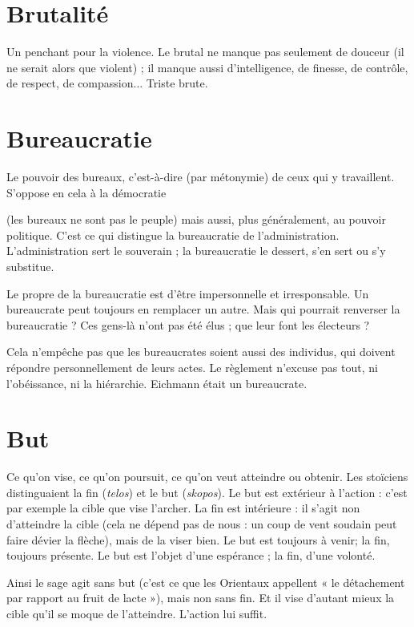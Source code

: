 \section{Brutalité}
Un penchant pour la violence. Le brutal ne manque pas seulement
de douceur (il ne serait alors que violent) ; il manque
aussi d'intelligence, de finesse, de contrôle, de respect, de compassion... Triste
brute.

\section{Bureaucratie}
Le pouvoir des bureaux, c’est-à-dire (par métonymie) de
ceux qui y travaillent. S’oppose en cela à la démocratie

(les bureaux ne sont pas le peuple) mais aussi, plus généralement, au pouvoir
politique. C’est ce qui distingue la bureaucratie de l'administration. L’administration
sert le souverain ; la bureaucratie le dessert, s’en sert ou s’y substitue.

Le propre de la bureaucratie est d’être impersonnelle et irresponsable. Un
bureaucrate peut toujours en remplacer un autre. Mais qui pourrait renverser la
bureaucratie ? Ces gens-là n’ont pas été élus ; que leur font les électeurs ?

Cela n'empêche pas que les bureaucrates soient aussi des individus, qui doivent
répondre personnellement de leurs actes. Le règlement n’excuse pas tout,
ni l’obéissance, ni la hiérarchie. Eichmann était un bureaucrate.

\section{But}
Ce qu'on vise, ce qu’on poursuit, ce qu’on veut atteindre ou obtenir.
Les stoïciens distinguaient la fin ({\it telos}) et le but ({\it skopos}). Le but est
extérieur à l’action : c’est par exemple la cible que vise l’archer. La fin est
intérieure : il s’agit non d’atteindre la cible (cela ne dépend pas de nous : un
coup de vent soudain peut faire dévier la flèche), mais de la viser bien. Le but
est toujours à venir; la fin, toujours présente. Le but est l’objet d’une
espérance ; la fin, d’une volonté.

Ainsi le sage agit sans but (c’est ce que les Orientaux appellent « le détachement
par rapport au fruit de lacte »), mais non sans fin. Et il vise d’autant
mieux la cible qu’il se moque de l'atteindre. L'action lui suffit.

